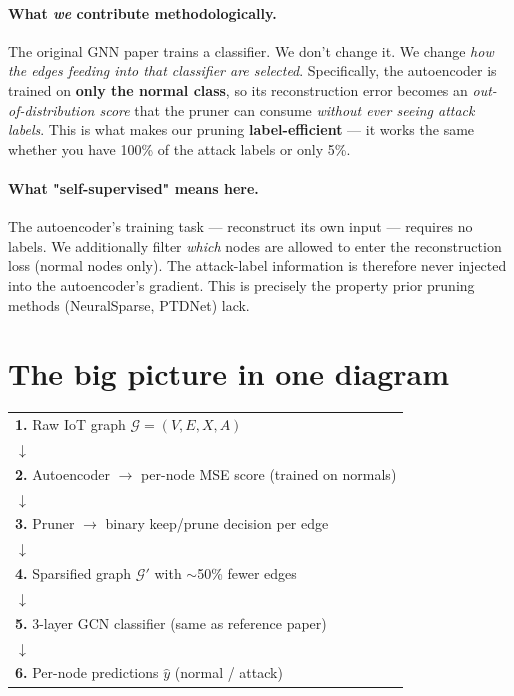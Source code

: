 \documentclass[11pt,a4paper]{article}
\begin{document}
\paragraph{What \emph{we} contribute methodologically.}
The original GNN paper trains a classifier. We don't change it. We
change \emph{how the edges feeding into that classifier are selected}.
Specifically, the autoencoder is trained on \textbf{only the normal
class}, so its reconstruction error becomes an
\emph{out-of-distribution score} that the pruner can consume
\emph{without ever seeing attack labels}. This is what makes our pruning
\textbf{label-efficient} --- it works the same whether you have 100\%
of the attack labels or only 5\%.

\paragraph{What "self-supervised" means here.}
The autoencoder's training task --- reconstruct its own input ---
requires no labels. We additionally filter \emph{which} nodes are
allowed to enter the reconstruction loss (normal nodes only). The
attack-label information is therefore never injected into the
autoencoder's gradient. This is precisely the property prior pruning
methods (NeuralSparse, PTDNet) lack.

\section{The big picture in one diagram}

\begin{center}
\renewcommand{\arraystretch}{1.25}
\begin{tabular}{p{}}
\toprule
\textbf{1.} Raw IoT graph $\mathcal{G} = (V, E, X, A)$ \\
\quad $\downarrow$ \\
\textbf{2.} Autoencoder $\to$ per-node MSE score (trained on normals)\\
\quad $\downarrow$ \\
\textbf{3.} Pruner $\to$ binary keep/prune decision per edge\\
\quad $\downarrow$ \\
\textbf{4.} Sparsified graph $\mathcal{G}'$ with $\sim$50\% fewer edges\\
\quad $\downarrow$ \\
\textbf{5.} 3-layer GCN classifier (same as reference paper)\\
\quad $\downarrow$ \\
\textbf{6.} Per-node predictions $\hat{y}$ (normal / attack)\\
\bottomrule
\end{tabular}
\end{center}
\end{document}
